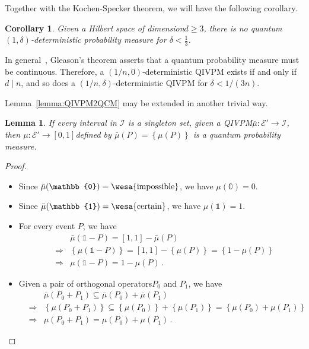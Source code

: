 \documentclass[12pt]{iopart}
\theoremstyle{plain}
\newtheorem{lemma}[thm]{Lemma}
\newtheorem{cor}[thm]{Corollary}
\theoremstyle{definition}
\theoremstyle{remark}
\newcommand{\events}{\ensuremath{\mathcal{E}}}
\newcommand{\imposs}{{\mbox{\wesa{impossible}}}}
\newcommand{\necess}{{\mbox{\wesa{certain}}}}
\newcommand{\nb}{\nolinebreak[3] }
\begin{document}
Together with the Kochen-Specker theorem, we will have the following
corollary.

\begin{cor}\label{cor:Kochen-Specker-IVPM}Given a Hilbert space
of dimension\nb$d\ge3$, there is no quantum $\left(1,\delta\right)$-deterministic
probability measure for $\delta<\frac{1}{3}$.\end{cor}

In general~\cite{Redhead1987-REDINA}, Gleason's theorem asserts
that a quantum probability measure must be continuous. Therefore,
a $\left(1/n,0\right)$-deterministic QIVPM exists if and only if
$d\mid n$, and so does a $\left(1/n,\delta\right)$-deterministic
QIVPM for $\delta<1/\left(3n\right)$.

Lemma~\ref{lemma:QIVPM2QCM} may be extended in another trivial way.

\begin{lemma}If every interval in $\mathscr{I}$ is a singleton set,
given a QIVPM\nb$\bar{\mu}:\events'\rightarrow\mathscr{I}$, then
$\mu:\events'\rightarrow\left[0,1\right]$defined by $\bar{\mu}\left(P\right)=\left\{ \mu\left(P\right)\right\} $
is a quantum probability measure.\end{lemma}

\begin{proof}~
\begin{itemize}
\item Since $\bar{\mu}(\mathbb{0})=\imposs$, we have $\mu(\mathbb{0})=0$.
\item Since $\bar{\mu}(\mathbb{1})=\necess$, we have $\mu(\mathbb{1})=1$.
\item For every event $P$, we have
\begin{eqnarray*}
 &  & \bar{\mu}\left(\mathbb{1}-P\right)=\left[1,1\right]-\bar{\mu}\left(P\right)\\
 & \Rightarrow & \left\{ \mu\left(\mathbb{1}-P\right)\right\} =\left[1,1\right]-\left\{ \mu\left(P\right)\right\} =\left\{ 1-\mu\left(P\right)\right\} \\
 & \Rightarrow & \mu\left(\mathbb{1}-P\right)=1-\mu\left(P\right)\,.
\end{eqnarray*}
\item Given a pair of orthogonal operators\nb$P_{0}$ and $P_{1}$, we
have
\begin{eqnarray*}
 &  & \bar{\mu}\left(P_{0}+P_{1}\right)\subseteq\bar{\mu}\left(P_{0}\right)+\bar{\mu}\left(P_{1}\right)\\
 & \Rightarrow & \left\{ \mu\left(P_{0}+P_{1}\right)\right\} \subseteq\left\{ \mu\left(P_{0}\right)\right\} +\left\{ \mu\left(P_{1}\right)\right\} =\left\{ \mu\left(P_{0}\right)+\mu\left(P_{1}\right)\right\} \\
 & \Rightarrow & \mu\left(P_{0}+P_{1}\right)=\mu\left(P_{0}\right)+\mu\left(P_{1}\right)\,.
\end{eqnarray*}
\end{itemize}
\end{proof}
\end{document}
